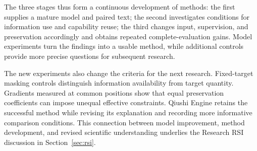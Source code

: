 The three stages thus form a continuous development of methods: the first supplies a mature model and paired text; the second investigates conditions for information use and capability reuse; the third changes input, supervision, and preservation accordingly and obtains repeated complete-evaluation gains. Model experiments turn the findings into a usable method, while additional controls provide more precise questions for subsequent research.

The new experiments also change the criteria for the next research. Fixed-target masking controls distinguish information availability from target quantity. Gradients measured at common positions show that equal preservation coefficients can impose unequal effective constraints. Qiushi Engine retains the successful method while revising its explanation and recording more informative comparison conditions. This connection between model improvement, method development, and revised scientific understanding underlies the Research RSI discussion in Section~\ref{sec:rsi}.
